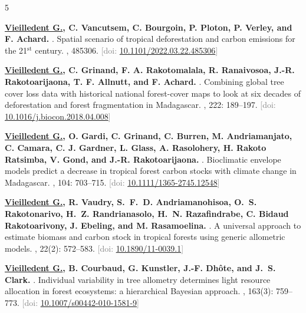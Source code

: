 \documentclass[10pt,a4paper,sans]{moderncv}
\newcounter{enumiv_gv}
\newcommand\doi[1]{[doi: \href{https://doi.org/#1}{#1}]}
\begin{document}
\begin{thebibliography}{5}

\setcounter{enumiv}{4}
\textbf{\underline{Vieilledent G.}, C. Vancutsem, C. Bourgoin, P. Ploton, P. Verley, and F. Achard.} 
.
\newblock Spatial scenario of tropical deforestation and carbon emissions for the 21$^{\text{st}}$ century.
, 485306.
\newblock \textcolor{gray}{\doi{10.1101/2022.03.22.485306}}

\setcounter{enumiv}{3}
\textbf{\underline{Vieilledent G.}, C. Grinand, F. A. Rakotomalala, R. Ranaivosoa, J.-R. Rakotoarijaona, T. F. Allnutt, and F. Achard.} 
.
\newblock Combining global tree cover loss data with historical national forest-cover maps to look at six decades of deforestation and forest fragmentation in Madagascar.
, 222: 189--197.
\newblock \textcolor{gray}{\doi{10.1016/j.biocon.2018.04.008}}

\setcounter{enumiv}{2}
\textbf{\underline{Vieilledent G.}, O. Gardi, C. Grinand, C. Burren, M. Andriamanjato, C. Camara, C. J. Gardner, L. Glass, A. Rasolohery, H. Rakoto Ratsimba, V. Gond, and J.-R. Rakotoarijaona.} 
.
\newblock Bioclimatic envelope models predict a decrease in tropical forest carbon stocks with climate change in Madagascar.
, 104: 703--715.
\newblock \textcolor{gray}{\doi{10.1111/1365-2745.12548}}

\setcounter{enumiv}{1}
\textbf{\underline{Vieilledent G.}, R. Vaudry, S.~F.~D. Andriamanohisoa, O.~S. Rakotonarivo, H.~Z.
  Randrianasolo, H.~N. Razafindrabe, C. Bidaud Rakotoarivony, J. Ebeling, and M. Rasamoelina.}
.
\newblock A universal approach to estimate biomass and carbon stock in tropical
  forests using generic allometric models.
, 22(2): 572--583.
\newblock \textcolor{gray}{\doi{10.1890/11-0039.1}}

\setcounter{enumiv}{0}
\textbf{\underline{Vieilledent G.}, B. Courbaud, G. Kunstler, J.-F. Dhôte, and J.~S. Clark.}
.
\newblock Individual variability in tree allometry determines light resource
  allocation in forest ecosystems: a hierarchical Bayesian approach.
, 163(3): 759--773.
\newblock \textcolor{gray}{\doi{10.1007/s00442-010-1581-9}}

\end{thebibliography}
\end{document}
